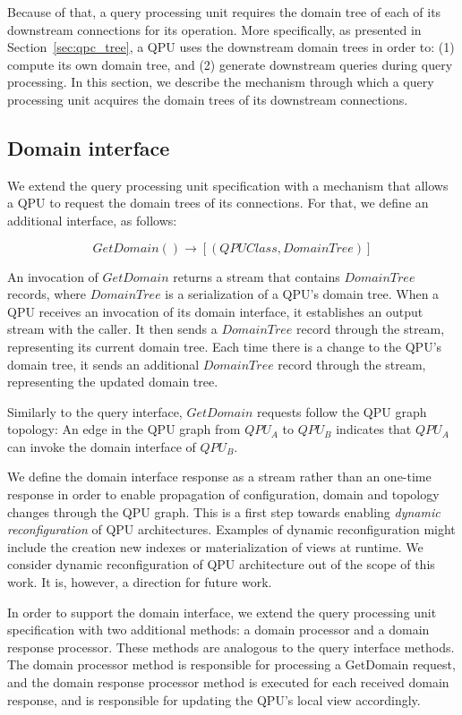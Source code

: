 Because of that, a query processing unit requires the domain tree of each of its downstream connections for its operation.
More specifically, as presented in Section~\ref{sec:qpc_tree}, a QPU uses the downstream domain trees in order to:
(1) compute its own domain tree, and (2) generate downstream queries during query processing.
In this section, we describe the mechanism through which a query processing unit acquires the domain trees
of its downstream connections.

\subsection{Domain interface}
We extend the query processing unit specification with a mechanism that allows a QPU to request the domain trees of its connections.
For that, we define an additional interface, as follows:

\begin{displaymath}
  GetDomain() \rightarrow [(QPUClass, DomainTree)]
\end{displaymath}

An invocation of $GetDomain$ returns a stream that contains $DomainTree$ records, where $DomainTree$ is a serialization of a QPU's domain tree.
When a QPU receives an invocation of its domain interface, it establishes an output stream with the caller.
It then sends a $DomainTree$ record through the stream, representing its current domain tree.
Each time there is a change to the QPU's domain tree, it sends an additional $DomainTree$ record through the stream,
representing the updated domain tree.

Similarly to the query interface, $GetDomain$ requests follow the QPU graph topology:
An edge in the QPU graph from $QPU_A$ to $QPU_B$ indicates that $QPU_A$ can invoke the domain interface of $QPU_B$.

We define the domain interface response as a stream rather than an one-time response in order to enable propagation of
configuration, domain and topology changes through the QPU graph.
This is a first step towards enabling \textit{dynamic reconfiguration} of QPU architectures.
Examples of dynamic reconfiguration might include the creation new indexes or materialization of views at runtime.
We consider dynamic reconfiguration of QPU architecture out of the scope of this work.
It is, however, a direction for future work.

In order to support the domain interface, we extend the query processing unit specification with two additional methods:
a domain processor and a domain response processor.
These methods are analogous to the query interface methods.
The domain processor method is responsible for processing a GetDomain request,
and the domain response processor method is executed for each received domain response,
and is responsible for updating the QPU's local view accordingly.

